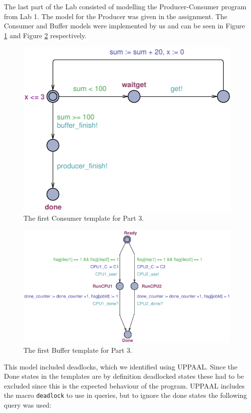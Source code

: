 \documentclass[a4paper,10pt]{article}
\begin{document}
The last part of the Lab consisted of modelling the Producer-Consumer program from Lab 1. The model for the Producer was given in the assignment. The Consumer and Buffer models were implemented by us and can be seen in Figure \ref{img:part3consumer} and Figure \ref{img:part3buffer} respectively.

\begin{figure}[h]
  \center
  \includegraphics{Part3Consumer.pdf}
  \caption{The first Consumer template for Part 3.}
  \label{img:part3consumer}
\end{figure}

\begin{figure}[h]
  \center
  \includegraphics{Part3Buffer.pdf}
  \caption{The first Buffer template for Part 3.}
  \label{img:part3buffer}
\end{figure}

This model included deadlocks, which we identified using UPPAAL. Since the Done states in the templates are by definition deadlocked states these had to be excluded since this is the expected behaviour of the program. UPPAAL includes the macro \texttt{deadlock} to use in queries, but to ignore the done states the following query was used:
\end{document}

